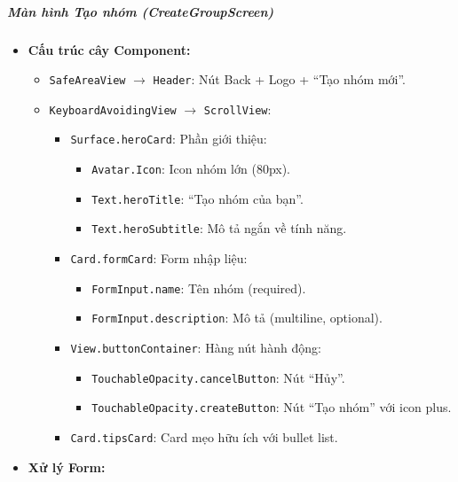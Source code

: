 \subparagraph{Màn hình Tạo nhóm (CreateGroupScreen)}
\begin{itemize}
    \item \textbf{Cấu trúc cây Component:}
        \begin{itemize}
            \item \texttt{SafeAreaView} $\rightarrow$ \texttt{Header}: Nút Back + Logo + ``Tạo nhóm mới''.
            \item \texttt{KeyboardAvoidingView} $\rightarrow$ \texttt{ScrollView}:
                \begin{itemize}
                    \item \texttt{Surface.heroCard}: Phần giới thiệu:
                        \begin{itemize}
                            \item \texttt{Avatar.Icon}: Icon nhóm lớn (80px).
                            \item \texttt{Text.heroTitle}: ``Tạo nhóm của bạn''.
                            \item \texttt{Text.heroSubtitle}: Mô tả ngắn về tính năng.
                        \end{itemize}
                    \item \texttt{Card.formCard}: Form nhập liệu:
                        \begin{itemize}
                            \item \texttt{FormInput.name}: Tên nhóm (required).
                            \item \texttt{FormInput.description}: Mô tả (multiline, optional).
                        \end{itemize}
                    \item \texttt{View.buttonContainer}: Hàng nút hành động:
                        \begin{itemize}
                            \item \texttt{TouchableOpacity.cancelButton}: Nút ``Hủy''.
                            \item \texttt{TouchableOpacity.createButton}: Nút ``Tạo nhóm'' với icon plus.
                        \end{itemize}
                    \item \texttt{Card.tipsCard}: Card mẹo hữu ích với bullet list.
                \end{itemize}
        \end{itemize}
    \item \textbf{Xử lý Form:}

\end{itemize}
